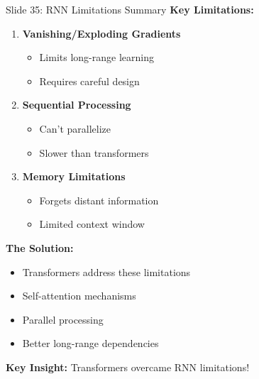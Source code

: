 \documentclass[8pt]{beamer}
\begin{document}
	\begin{frame}{Slide 35: RNN Limitations Summary}
		\fontsize{6.5}{7.5}\selectfont
		\textbf{Key Limitations:}
		\begin{enumerate}
			\item \textbf{Vanishing/Exploding Gradients}
			\begin{itemize}
				\item Limits long-range learning
				\item Requires careful design
			\end{itemize}
			\item \textbf{Sequential Processing}
			\begin{itemize}
				\item Can't parallelize
				\item Slower than transformers
			\end{itemize}
			\item \textbf{Memory Limitations}
			\begin{itemize}
				\item Forgets distant information
				\item Limited context window
			\end{itemize}
		\end{enumerate}
		
		\vspace{0.1cm}
		\textbf{The Solution:}
		\begin{itemize}
			\item Transformers address these limitations
			\item Self-attention mechanisms
			\item Parallel processing
			\item Better long-range dependencies
		\end{itemize}
		
		\textcolor{myblue}{\textbf{Key Insight:}} Transformers overcame RNN limitations!
	\end{frame}
	
	
\end{document}

